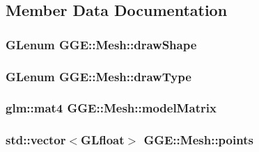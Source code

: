 \subsection{Member Data Documentation}
\hypertarget{class_g_g_e_1_1_mesh_a31f188bc943c5586befddc8838bd7c9a}{
\subsubsection[{draw\+Shape}]{\setlength{\rightskip}{0pt plus 5cm}G\+Lenum G\+G\+E\+::\+Mesh\+::draw\+Shape\hspace{0.3cm}{\ttfamily [private]}}}\label{class_g_g_e_1_1_mesh_a31f188bc943c5586befddc8838bd7c9a}
\hypertarget{class_g_g_e_1_1_mesh_a92c516168dc3400a468cd4dd632287f6}{
\subsubsection[{draw\+Type}]{\setlength{\rightskip}{0pt plus 5cm}G\+Lenum G\+G\+E\+::\+Mesh\+::draw\+Type\hspace{0.3cm}{\ttfamily [private]}}}\label{class_g_g_e_1_1_mesh_a92c516168dc3400a468cd4dd632287f6}
\hypertarget{class_g_g_e_1_1_mesh_a8ec6ca9082c5573198be3e9d675c2e92}{
\subsubsection[{model\+Matrix}]{\setlength{\rightskip}{0pt plus 5cm}glm\+::mat4 G\+G\+E\+::\+Mesh\+::model\+Matrix\hspace{0.3cm}{\ttfamily [private]}}}\label{class_g_g_e_1_1_mesh_a8ec6ca9082c5573198be3e9d675c2e92}
\hypertarget{class_g_g_e_1_1_mesh_ab91ef29f57f9f8b7cddb7f360da63f47}{
\subsubsection[{points}]{\setlength{\rightskip}{0pt plus 5cm}std\+::vector$<$G\+Lfloat$>$ G\+G\+E\+::\+Mesh\+::points\hspace{0.3cm}{\ttfamily [private]}}}\label{class_g_g_e_1_1_mesh_ab91ef29f57f9f8b7cddb7f360da63f47}
